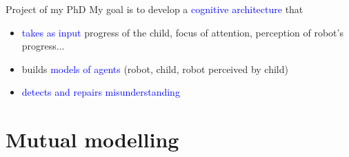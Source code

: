 \documentclass[compress]{beamer}
\begin{document}
\begin{frame}{Project of my PhD}
My goal is to develop a \textcolor{blue}{cognitive architecture} that 
\begin{itemize}
\item \textcolor{blue}{takes as input} progress of the child, focus of attention, perception of robot's progress...
\item builds \textcolor{blue}{models of agents} (robot, child, robot perceived by child) 
\item \textcolor{blue}{detects and repairs misunderstanding}
\end{itemize}
\end{frame}


\section*{Mutual modelling}
\end{document}
